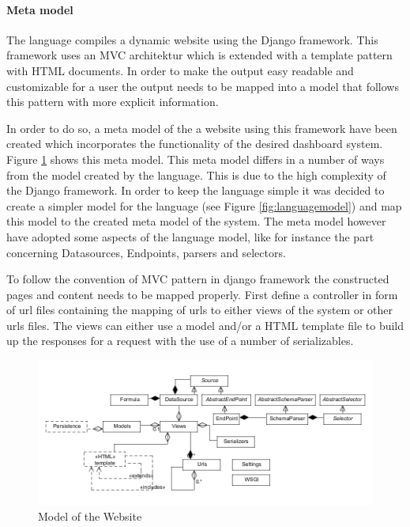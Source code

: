 \paragraph{Meta model}
The language compiles a dynamic website using the Django framework.
This framework uses an MVC architektur which is extended with a template pattern with
HTML documents. 
In order to make the output easy readable and customizable for a user the output needs to be
mapped into a model that follows this pattern with more explicit information.

In order to do so, a meta model of the a website using this framework have been created which
incorporates the functionality of the desired dashboard system.  
Figure \ref{fig:websitemodel} shows this meta model.
This meta model differs in a number of ways from the model created by the language.
This is due to the high complexity of the Django framework.
In order to keep the language simple it was decided to create a simpler model for the language
(see Figure \ref{fig:languagemodel}) and map this model to the created meta model of the system.
The meta model however have adopted some aspects of the language model, like for instance
the part concerning Datasources, Endpoints, parsers and selectors.
 
To follow the convention of MVC pattern in django framework the constructed pages and
content needs to be mapped properly. First define a controller in form of url files containing
the mapping of urls to either views of the system or other urls files.
The views can either use a model and/or a HTML template file to build up the responses for a
request with the use of a number of serializables.

\begin{figure}
\begin{center}
\includegraphics[width=\linewidth]{images/websitemodel}
\end{center}
\caption{Model of the Website}
\label{fig:websitemodel}
\end{figure}

